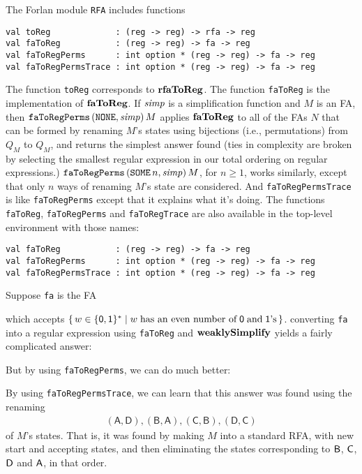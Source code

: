 The Forlan module \texttt{RFA} includes functions
\begin{verbatim}
val toReg             : (reg -> reg) -> rfa -> reg
val faToReg           : (reg -> reg) -> fa -> reg
val faToRegPerms      : int option * (reg -> reg) -> fa -> reg
val faToRegPermsTrace : int option * (reg -> reg) -> fa -> reg
\end{verbatim}
%
%
%
%
The function \texttt{toReg} corresponds to $\mathbf{rfaToReg}$.
The function \texttt{faToReg} is the implementation of $\mathbf{faToReg}$.  If
${\it simp}$ is a simplification function and $M$ is an FA, then
$\mathtt{faToRegPerms}\,(\mathtt{NONE},{\it simp})\,M$ applies $\mathbf{faToReg}$
to all of the FAs $N$ that can be formed by renaming $M$'s states
using bijections (i.e., permutations) from $Q_M$ to $Q_M$, and returns
the simplest answer found (ties in complexity are broken by selecting
the smallest regular expression in our total ordering on regular
expressions.)
$\mathtt{faToRegPerms}\,(\mathtt{SOME}\,n,{\it simp})\,M$, for $n\geq 1$,
works similarly, except that only $n$ ways of renaming $M$'s state are
considered.  And \texttt{faToRegPermsTrace} is like
\texttt{faToRegPerms} except that it explains what it's doing.  The
functions \texttt{faToReg}, \texttt{faToRegPerms} and
\texttt{faToRegTrace} are also available in the top-level environment
with those names:
\begin{verbatim}
val faToReg           : (reg -> reg) -> fa -> reg
val faToRegPerms      : int option * (reg -> reg) -> fa -> reg
val faToRegPermsTrace : int option * (reg -> reg) -> fa -> reg
\end{verbatim}
%
%
%
%
%
%

Suppose \texttt{fa} is the FA
\begin{center}

\end{center}
which accepts $\{ \, w\in\{\mathsf{0,1}\}^* \mid w\;\allowbreak\mbox{has
an even number of}\allowbreak\;\mathsf{0}\;\allowbreak\mbox{and}\allowbreak\;\mathsf{1}\allowbreak\mbox{'s}\allowbreak \, \}$.
converting \texttt{fa} into a regular expression using
\texttt{faToReg} and $\mathbf{weaklySimplify}$ yields a fairly complicated answer:

But by using \texttt{faToRegPerms}, we can do much better:

By using \texttt{faToRegPermsTrace}, we can learn that this answer was
found using the renaming
\begin{gather*}
\mathsf{(A, D), (B, A), (C, B), (D, C)}
\end{gather*}
of $M$'s states.  That is, it was found by making $M$ into
a standard RFA, with new start and accepting states,
and then eliminating the states corresponding to
$\mathsf{B}$, $\mathsf{C}$, $\mathsf{D}$ and $\mathsf{A}$, in that order.

